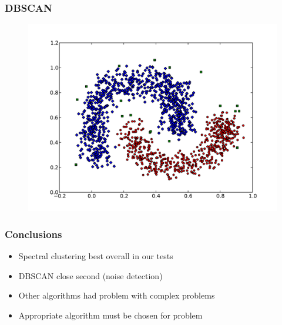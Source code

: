 \documentclass{beamer}
\begin{document}
\begin{frame}
\frametitle{DBSCAN}
    \begin{figure}[]
    \includegraphics[scale=0.5]{dbscan_half-moons.pdf}
    \end{figure}
\end{frame}


\begin{frame}
\frametitle{Conclusions}
    \begin{itemize}
	\item Spectral clustering best overall in our tests
    	\item DBSCAN close second (noise detection)
	\item Other algorithms had problem with complex problems

   	\item Appropriate algorithm must be chosen for problem
    \end{itemize}
\end{frame}
\end{document}
